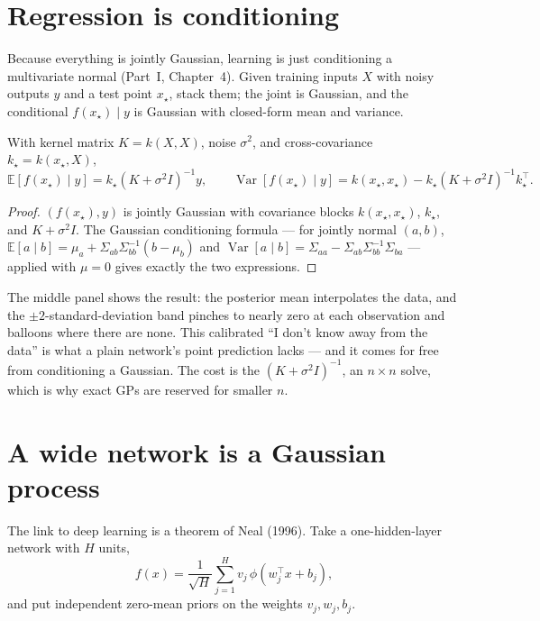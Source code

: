 \documentclass[11pt]{article}
\begin{document}
\section{Regression is conditioning}

Because everything is jointly Gaussian, learning is just conditioning a
multivariate normal (Part~I, Chapter~4). Given training inputs $X$ with noisy
outputs $y$ and a test point $x_\star$, stack them; the joint is Gaussian, and the
conditional $f(x_\star)\mid y$ is Gaussian with closed-form mean and variance.

\begin{theorem}
With kernel matrix $K=k(X,X)$, noise $\sigma^2$, and cross-covariance
$k_\star = k(x_\star,X)$,
\[
  \mathbb{E}[f(x_\star)\mid y] = k_\star (K+\sigma^2 I)^{-1} y,
  \qquad
  \operatorname{Var}[f(x_\star)\mid y] = k(x_\star,x_\star) - k_\star (K+\sigma^2 I)^{-1} k_\star^\top.
\]
\end{theorem}
\begin{proof}
$(f(x_\star), y)$ is jointly Gaussian with covariance blocks
$k(x_\star,x_\star)$, $k_\star$, and $K+\sigma^2 I$. The Gaussian conditioning
formula --- for jointly normal $(a,b)$, $\mathbb{E}[a\mid b]=\mu_a +
\Sigma_{ab}\Sigma_{bb}^{-1}(b-\mu_b)$ and
$\operatorname{Var}[a\mid b]=\Sigma_{aa}-\Sigma_{ab}\Sigma_{bb}^{-1}\Sigma_{ba}$
--- applied with $\mu=0$ gives exactly the two expressions.
\end{proof}

The middle panel shows the result: the posterior mean interpolates the data, and
the $\pm 2$-standard-deviation band pinches to nearly zero at each observation and
balloons where there are none. This calibrated ``I don't know away from the
data'' is what a plain network's point prediction lacks --- and it comes for free
from conditioning a Gaussian. The cost is the $(K+\sigma^2 I)^{-1}$, an $n\times
n$ solve, which is why exact GPs are reserved for smaller $n$.

\section{A wide network is a Gaussian process}

The link to deep learning is a theorem of Neal (1996). Take a one-hidden-layer
network with $H$ units,
\[
  f(x) = \frac{1}{\sqrt H}\sum_{j=1}^H v_j\,\phi(w_j^\top x + b_j),
\]
and put independent zero-mean priors on the weights $v_j,w_j,b_j$.
\end{document}
